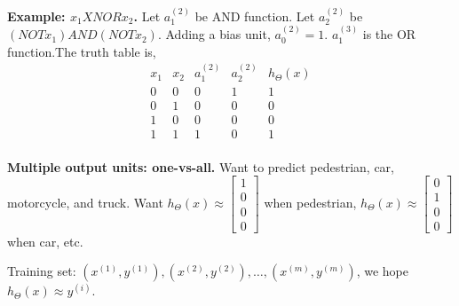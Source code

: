 \documentclass[a4 paper, 11 pt]{article}
\begin{document}
\textbf{Example: $x_1 XNOR x_2$.} Let $a_1^{(2)}$ be AND function. Let $a_2^{(2)}$ be $(NOT x_1) AND (NOT x_2)$. Adding a bias unit, $a_0^{(2)} = 1$. $a_1^{(3)}$ is the OR function.The truth table is,
\[
\begin{array}{cc|cc|c}
x_1 & x_2 & a_1^{(2)} & a_2^{(2)} & h_\Theta(x) \\ \hline
0 & 0 & 0 & 1 & 1\\
0 & 1 & 0 & 0 & 0\\
1 & 0 & 0 & 0 & 0\\
1 & 1 & 1 & 0 & 1 \\
\end{array}
\]

\textbf{Multiple output units: one-vs-all.} Want to predict pedestrian, car, motorcycle, and truck. Want $h_\Theta(x) \approx \begin{bmatrix} 1 \\ 0 \\ 0 \\ 0\end{bmatrix}$ when pedestrian, $h_\Theta(x) \approx \begin{bmatrix} 0 \\ 1 \\ 0 \\ 0\end{bmatrix}$ when car, etc.

Training set: $(x^{(1)}, y^{(1)}), (x^{(2)}, y^{(2)}), \ldots, (x^{(m)}, y^{(m)})$, we hope $h_\Theta(x) \approx y^{(i)}$.
\end{document}
